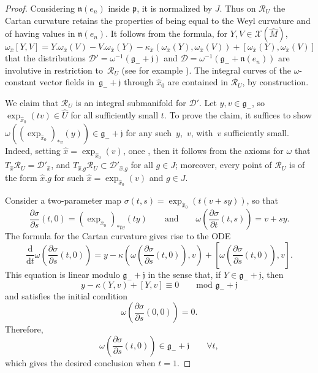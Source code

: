 \documentclass[10pt,a4paper]{amsart}
\numberwithin{equation}{section}
\theoremstyle{definition}
\def\g{{\mathfrak g}}
\def\p{{\mathfrak p}}
\def\n{{\mathfrak n}}
\begin{document}
\begin{proof}
Considering $\n(e_n)$ inside $\p$, it is normalized by $J$. Thus on $\mathcal{R}_U$ the Cartan curvature retains the properties of being equal to the Weyl curvature and of having values in $\n(e_n)$. It follows from the formula, for $Y,V \in \mathcal{X}(\hat{M})$,
\[\omega_{\hat{x}}[Y,V] = Y.\omega_{\hat{x}}(V) - V. \omega_{\hat{x}}(Y) - \kappa_{\hat{x}}(\omega_{\hat{x}}(Y),\omega_{\hat{x}}(V)) + [ \omega_{\hat{x}}(Y),\omega_{\hat{x}}(V)] \]
that the distributions $\mathcal{D}' = \omega^{-1}(\g_- + \mathfrak{j})$ and $\mathcal{D} = \omega^{-1}(\g_- + \n(e_n))$ are involutive in restriction to~$\mathcal{R}_U$ (see for example \cite[Section~4]{mp.confdambra}). The integral curves of the $\omega$-constant vector fields in~${\g_- + \mathfrak{j}}$ through $\hat{x}_0$ are contained in $\mathcal{R}_U$, by construction.

We claim that $\mathcal{R}_U$ is an integral submanifold for $\mathcal{D}'$. Let $y, v \in \g_-$, so $\exp_{\hat{x}_0} (tv) \in \hat{U}$ for all sufficiently small $t$. To prove the claim, it suffices to show $\omega((\exp_{\hat{x}_0})_{*v} (y)) \in \g_- + \mathfrak{j}$ for any such~$y$,~$v$, with~$v$ sufficiently small. Indeed, setting $\hat{x} = \exp_{\hat{x}_0} (v)$, once , then it follows from the axioms for $\omega$ that $T_{\hat{x}} \mathcal{R}_U = \mathcal{D}'_{\hat{x}}$, and $T_{\hat{x}.g} \mathcal{R}_U \subset \mathcal{D}'_{\hat{x}.g}$ for all $g \in J$; moreover, every point of $\mathcal{R}_U$ is of the form $\hat{x}.g$ for such $\hat{x} = \exp_{\hat{x}_0}(v)$ and $g \in J$.

Consider a two-parameter map $\sigma(t,s) = \exp_{\hat{x}_0} (t(v+sy))$, so that
\[ \frac{\partial \sigma}{\partial s} (t,0) = (\exp_{\hat{x}_0})_{*tv}(ty) \qquad \mbox{and} \qquad \omega \left( \frac{\partial \sigma}{\partial t} (t,s) \right) = v + sy.\]
The formula for the Cartan curvature gives rise to the ODE
\[ \frac{\mathrm{d}}{\mathrm{d}t} \omega \left( \frac{\partial \sigma}{\partial s}(t,0) \right) = y - \kappa \left( \omega \left( \frac{\partial \sigma}{\partial s} (t,0) \right), v \right) + \left[ \omega \left( \frac{\partial \sigma}{\partial s}(t,0)\right), v \right].\]
This equation is linear modulo $\g_- + \mathfrak{j}$ in the sense that, if $Y \in \g_- + \mathfrak{j}$, then
\[ y - \kappa (Y, v ) + [Y,v] \equiv 0 \qquad \mbox{mod } \g_- + \mathfrak{j}\]
and satisfies the initial condition
\[\omega \left( \frac{\partial \sigma}{\partial s}(0,0) \right) = 0.\]
Therefore,
\[\omega \left( \frac{\partial \sigma}{\partial s}(t,0) \right) \in \g_- + \mathfrak{j} \qquad \forall t,\]
which gives the desired conclusion when $t=1$.


\end{proof}
\end{document}
